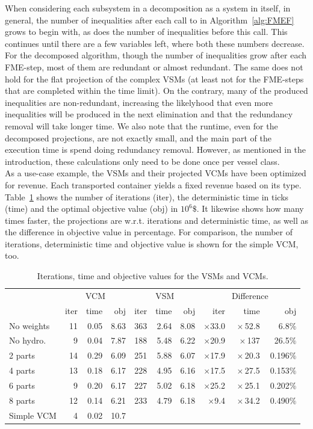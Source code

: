 \documentclass{llncs}
\newcommand{\btablesize}{\begin{scriptsize}}
\newcommand{\etablesize}{\end{scriptsize}}
\begin{document}
\indent When considering each subsystem in a decomposition as a system in itself, in general, the number of inequalities after each call to  in Algorithm~\ref{alg:FMEF} grows to begin with, as does the number of inequalities before this call. This continues until there are a few variables left, where both these numbers decrease. For the decomposed algorithm, though the number of inequalities grow after each FME-step, most of them are redundant or almost redundant. The same does not hold for the flat projection of the complex VSMs (at least not for the FME-steps that are completed within the time limit). On the contrary, many of the produced inequalities are non-redundant, increasing the likelyhood that even more inequalities will be produced in the next elimination and that the redundancy removal will take longer time. We also note that the runtime, even for the decomposed projections, are not exactly small, and the main part of the execution time is spend doing redundancy removal. However, as mentioned in the introduction, these calculations only need to be done once per vessel class. \\
\indent As a use-case example, the VSMs and their projected VCMs have been optimized for revenue. Each transported container yields a fixed revenue based on its type. Table~\ref{tab:usingProjections} shows the number of iterations (iter), the deterministic time in ticks (time) and the optimal objective value (obj) in $10^6 \$$. It likewise shows how many times faster, the projections are w.r.t. iterations and deterministic time, as well as the difference in objective value in percentage. For comparison, the number of iterations, deterministic time and objective value is shown for the simple VCM, too.
\begin{table}[tb]
\caption{Iterations, time and objective values for the VSMs and VCMs.}
\label{tab:usingProjections}
\centering
\btablesize
\begin{tabular}{l|r@{\:\;}r@{\:\;}r|r@{\:\;}r@{\:\:\:}r|rrr}
&\multicolumn{3}{c|}{VCM}&\multicolumn{3}{c|}{VSM}&\multicolumn{3}{c}{Difference}\\
					&iter&time  &obj 	 &iter  &time  &obj	&iter 			 &time					&obj\\ 
\hline
No weights&	11 & 0.05 & 8.63 &	363 & 2.64 &8.08&$\times$33.0&$\:\times$52.8&$\:$6.8$\%$\\
No hydro. &  9 & 0.04 & 7.87 &	188 & 5.48 &6.22&$\times$20.9&$\:\times$137 &$\:$26.5$\%$\\
2 parts		& 14 & 0.29 & 6.09 &	251 & 5.88 &6.07&$\times$17.9&$\:\times$20.3&$\:$0.196$\%$\\
4 parts 	& 13 & 0.18 & 6.17 &  228 & 4.95 &6.16&$\times$17.5&$\:\times$27.5&$\:$0.153$\%$\\
6 parts 	&  9 & 0.20 & 6.17 &  227 & 5.02 &6.18&$\times$25.2&$\:\times$25.1&$\:$0.202$\%$\\
8 parts 	& 12 & 0.14 & 6.21 &  233 & 4.79 &6.18&$\times$9.4&$\:\times$34.2&$\:$0.490$\%$\\
\bottomrule
Simple VCM&  4 & 0.02 &10.7\phantom{0}\\
\end{tabular}
\etablesize
\end{table}
\end{document}
